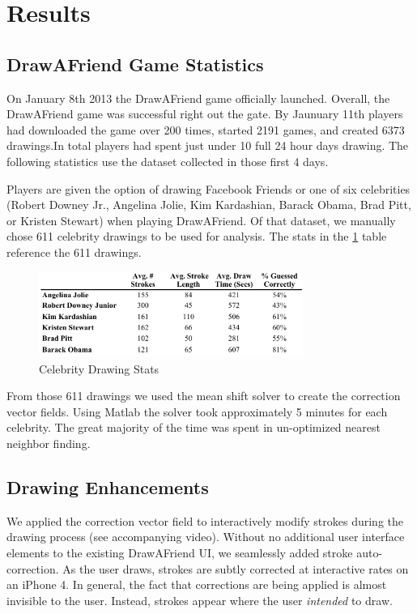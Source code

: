 \section{Results}

\subsection{DrawAFriend Game Statistics}

On January 8th 2013 the DrawAFriend game officially launched. Overall, the DrawAFriend game was successful right out the gate. By Jaunuary 11th players had downloaded the game over 200 times, started 2191 games, and created 6373 drawings.In total players had spent just under 10 full 24 hour days drawing. The following statistics use the dataset collected in those first 4 days.

Players are given the option of drawing Facebook Friends or one of six celebrities (Robert Downey Jr., Angelina Jolie, Kim Kardashian, Barack Obama, Brad Pitt, or Kristen Stewart) when playing DrawAFriend. Of that dataset, we manually chose 611 celebrity drawings to be used for analysis. The stats in the \ref{fig:daf-stats} table reference the 611 drawings.

\begin{figure}[b]
  \centering%
\includegraphics[height=1.1in]{./figures/daf-stats-cropped.pdf}
  \caption{Celebrity Drawing Stats}
  \label{fig:daf-stats}
\end{figure}

From those 611 drawings we used the mean shift solver to create the correction vector fields. Using Matlab the solver took approximately 5 minutes for each celebrity. The great majority of the time was spent in un-optimized nearest neighbor finding.

\subsection {Drawing Enhancements}

We applied the correction vector field to interactively modify strokes during the drawing process (see accompanying video). Without no additional user interface elements to the existing DrawAFriend UI, we seamlessly added stroke auto-correction. As the user draws, strokes are subtly corrected at interactive rates on an iPhone 4. In general, the fact that corrections are being applied is almost invisible to the user. Instead, strokes appear where the user {\em intended} to draw.

